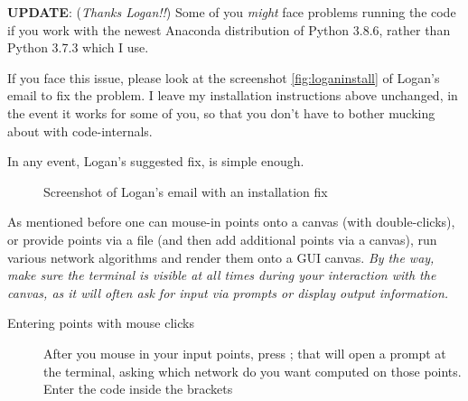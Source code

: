 \begin{appendices}
\begin{mdframed}[backgroundcolor=black!10,rightline=false,leftline=false]
\textbf{UPDATE}: (\textit{Thanks Logan!!}) Some of you \textit{might} face problems running the code if you work with the newest Anaconda distribution
of Python 3.8.6, rather than Python 3.7.3 which I use. 

If you face this issue, please look at the screenshot \autoref{fig:loganinstall} of Logan's email to fix the problem. 
I leave my installation instructions above unchanged, in the event it works for some of you, so that you don't have to bother
mucking about with code-internals. 

In any event, Logan's suggested fix, is simple enough. 
   
\begin{figure}[H]
  \centering
  \caption{\label{fig:loganinstall} Screenshot of Logan's email with an installation fix}
\end{figure}
\end{mdframed}



As mentioned before one can mouse-in points onto a canvas (with double-clicks), or provide points via a file (and then add additional points via a canvas), 
run various network algorithms and render them onto a GUI canvas. \textit{\footnotesize By the way, make sure the terminal is visible at all times during your 
interaction with the canvas, as it will often ask for input via prompts or display output information.}


\begin{description}
\item[Entering points with mouse clicks] After you  mouse in your input points, press ; that will open a prompt at the terminal, asking which 
network do  you want computed on those points. Enter the code inside the brackets  


\end{description}
\end{appendices}
